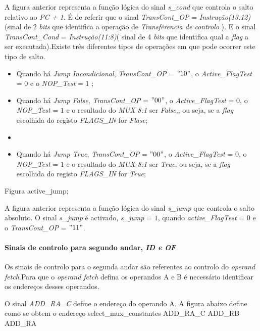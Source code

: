 \documentclass[11pt]{article}
\numberwithin{equation}{section}
\begin{document}
	A figura anterior representa a função lógica do sinal \textit{s\_cond} que controla o salto relativo ao \textit{PC + 1}. É  de referir que o sinal \textit{TransCont\_OP} = \textit{Instrução(13:12)}(sinal de 2 \textit{bits} que identifica a operação de \textit{Transfêrencia de controlo} ). E o sinal \textit{TransCont\_Cond} = \textit{Instrução(11:8)}( sinal de 4 \textit{bits} que identifica qual a \textit{flag} a ser executada).Existe três diferentes tipos de operações em que pode ocorrer este tipo de salto.
		\begin{itemize}
			\item Quando há \textit{Jump Incondicional}, \textit{TransCont\_OP} = $"10"$, o  \textit{Active\_FlagTest} = $0$ e o  \textit{NOP\_Test} = $1$ ;
			\vspace{-2.5mm}
			\item Quando há \textit{Jump False}, \textit{TransCont\_OP} = $"00"$, o  \textit{Active\_FlagTest} = $0$, o  \textit{NOP\_Test} = $1$ e o resultado do \textit{MUX 8:1} ser \textit{False},, ou seja, se a \textit{flag} escolhida do registo \textit{FLAGS\_IN} for \textit{Flase};
			\vspace{-2.5mm}
			\item  \item Quando há \textit{Jump True}, \textit{TransCont\_OP} = $"00"$, o  \textit{Active\_FlagTest} = $0$, o  \textit{NOP\_Test} = $1$ e o resultado do \textit{MUX 8:1} ser \textit{True}, ou seja, se a \textit{flag} escolhida do registo \textit{FLAGS\_IN} for \textit{True};
		\end{itemize}
	
 	Figura active\_jump;
 	
 	A figura anterior representa a função lógica do sinal \textit{s\_jump} que controla o salto absoluto. O sinal \textit{s\_jump} é activado, \textit{s\_jump} = $1$, quando \textit{active\_FlagTest} = $0$ e o \textit{TransCont\_OP} = $"11"$.
 	
 	
\paragraph{Sinais de controlo para segundo andar, \textit{ID e OF}}

Os sinais de controlo para o segunda andar são referentes ao controlo do \textit{operand fetch}.Para que o \textit{operand fetch} defina os operandos A e B é necessário identificar os endereços desses operandos.

	O sinal \textit{ADD\_RA\_C} define o endereço do operando A. A figura abaixo define como se obtem o endereço
 select\_mux\_constantes ADD\_RA\_C ADD\_RB ADD\_RA
\end{document}
